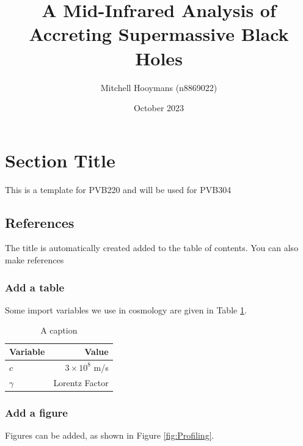 \documentclass[12pt]{article}
\title{A Mid-Infrared Analysis of Accreting Supermassive Black Holes}
\author{Mitchell Hooymans (n8869022)}
\date{October 2023}
\begin{document}
\maketitle
\newpage
\tableofcontents
\newpage



\section{Section Title}
This is a template for PVB220 and will be used for PVB304

    \subsection{References}

    The title is automatically created added to the table of contents. You can also make references 
    \citep{lacy_obscured_2004}

        \subsubsection{Add a table}
        Some import variables we use in cosmology are given in Table \ref{tab:aTable}.
        
            \begin{table}[H]
                \centering
                \caption{A caption}
                \begin{tabular}{lr}
                    \hline \hline
                    Variable & Value  \\
                    \hline 
                    $c$ & $3\times10^{8}$ m/s \\
                    $\gamma$ & Lorentz Factor \\
                    \hline
                \end{tabular}
                \label{tab:aTable}
            \end{table}
            
            
        \subsubsection{Add a figure}
        
        Figures can be added, as shown in Figure \ref{fig:Profiling}.
        
\end{document}
